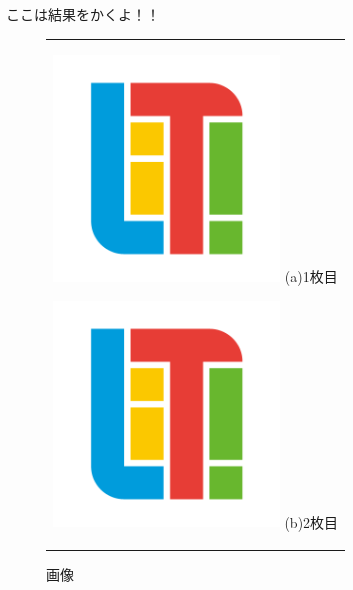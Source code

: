 \documentclass{jsarticle}
\begin{document}
ここは結果をかくよ！！
\begin{figure}[H]
\begin{center}
  \begin{tabular}{c}

    \begin{minipage}{0.5\hsize}
      \begin{center}
        \includegraphics[clip, width=60mm]{original.png}
        \hspace{1.6cm} (a)1枚目
      \end{center}
    \end{minipage}

    \begin{minipage}{0.5\hsize}
      \begin{center}
        \includegraphics[clip, width=60mm]{original.png}
        \hspace{1.6cm} (b)2枚目
      \end{center}
    \end{minipage}

  \end{tabular}
  \caption{画像}
  \label{fig:img}
  \end{center}
\end{figure}
\end{document}
